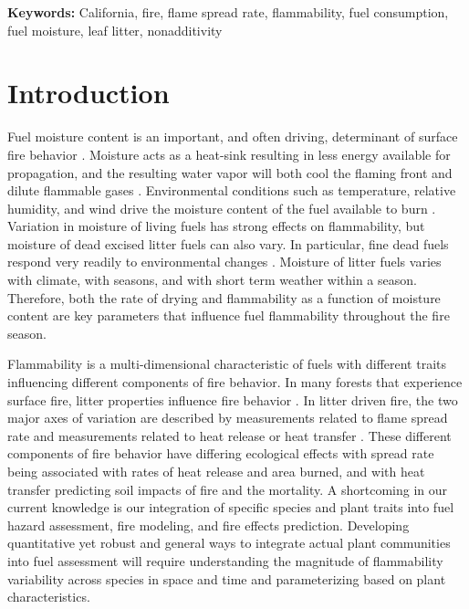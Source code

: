 \documentclass[letterpaper,12pt]{article}
\begin{document}
\noindent \textbf{Keywords:} California, fire, flame spread rate, flammability,
fuel consumption, fuel moisture, leaf litter, nonadditivity

\newpage

\section*{Introduction}

Fuel moisture content is an important, and often driving, determinant of
surface fire behavior \citep{Rothermel-1972}. Moisture acts as a heat-sink
resulting in less energy available for propagation, and the resulting water
vapor will both cool the flaming front and dilute flammable gases
\citep{Albini-1976, Shafizadeh-1977}. Environmental conditions such as
temperature, relative humidity, and wind drive the moisture content of the fuel
available to burn \citep{Kreye+Varner+etal-2018}. Variation in moisture of
living fuels has strong effects on flammability, but moisture of dead excised
litter fuels can also vary. In particular, fine dead fuels respond very readily
to environmental changes \citep{Nelson-2001}. Moisture of litter fuels varies
with climate, with seasons, and with short term weather within a season.
Therefore, both the rate of drying and flammability as a function of moisture
content are key parameters that influence fuel flammability throughout the fire
season.

Flammability is a multi-dimensional characteristic of fuels
\citep{Schwilk-2015, Pausas+Keeley+etal-2017} with different traits influencing
different components of fire behavior. In many forests that experience surface
fire, litter properties influence fire behavior
\citep{Ganteaume+Marielle+etal-2011, Schwilk+Caprio-2011,
  Varner+Kane+etal-2015}. In litter driven fire, the two major axes of
variation are described by measurements related to flame spread rate and
measurements related to heat release or heat transfer
\citep{Magalhaes+Schwilk-2012, Prior+Murphy+etal-2018}. These different
components of fire behavior have differing ecological effects with spread rate
being associated with rates of heat release and area burned, and with heat
transfer predicting soil impacts of fire and the mortality. A shortcoming in
our current knowledge is our integration of specific species and plant traits
into fuel hazard assessment, fire modeling, and fire effects prediction.
Developing quantitative yet robust and general ways to integrate actual plant
communities into fuel assessment will require understanding the magnitude of
flammability variability across species in space and time and parameterizing
based on plant characteristics.
\end{document}
